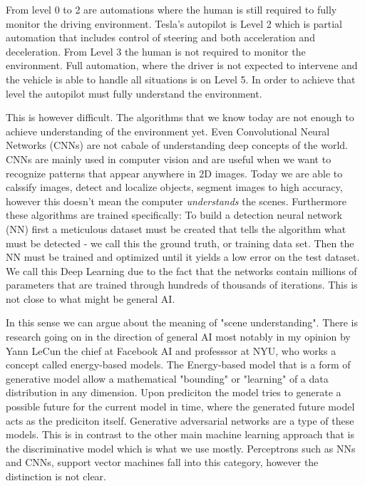 From level 0 to 2 are automations where the human is still required to fully
monitor the driving environment. Tesla's autopilot is Level 2 which is partial
automation that includes control of steering and both acceleration and
deceleration. From Level 3 the human is not required to monitor the environment.
Full automation, where the driver is not expected to intervene and the vehicle
is able to handle all situations is on Level 5. In order to achieve that level
the autopilot must fully understand the environment.

This is however difficult. The algorithms that we know today are not enough
to achieve understanding of the environment yet. Even Convolutional Neural
Networks (CNNs) are not cabale of understanding deep concepts of the world. CNNs
are mainly used in computer vision and are useful when we want to recognize
patterns that appear anywhere in 2D images. Today we are able to calssify
images, detect and localize objects, segment images to high accuracy,
however this doesn't mean the computer \emph{understands} the scenes.
Furthermore these algorithms are trained specifically: To build a detection
neural network (NN) first a meticulous dataset must be created that tells the
algorithm what must be detected - we call this the ground truth, or training
data set. Then the NN must be trained and optimized until it yields a low error
on the test dataset. We call this Deep Learning due to the fact that the
networks contain millions of parameters that are trained through hundreds of
thousands of iterations. This is not close to what might be general AI.

In this sense we can argue about the meaning of "scene understanding". There is
research going on in the direction of general AI most notably in my opinion by
Yann LeCun the chief at Facebook AI and professsor at NYU, who works a concept
called energy-based models. The Energy-based model that is a form of generative
model allow a mathematical "bounding" or "learning" of a data distribution in
any dimension. Upon prediciton the model tries to generate a possible future for
the current model in time, where the generated future model acts as the
prediciton itself. Generative adversarial networks are a type of these models.
This is in contrast to the other main machine learning approach that is the
discriminative model which is what we use mostly. Perceptrons such as NNs and
CNNs, support vector machines fall into this category, however the distinction
is not clear.

